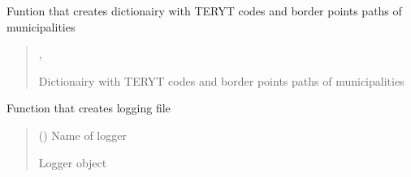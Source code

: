 \documentclass[letterpaper,10pt,english]{sphinxmanual}
\begin{document}

\begin{fulllineitems}
\label{\detokenize{pcm_utilities:pcm_utilities.create_geom_refs_dict}}
\pysigstartsignatures
{}
\pysigstopsignatures
\sphinxAtStartPar
Funtion that creates dictionairy with TERYT codes and border points paths of municipalities
\begin{quote}\begin{description}
\sphinxAtStartPar
\sphinxcode{\sphinxupquote{Dict}}{[}, \sphinxcode{\sphinxupquote{List}}{[}\sphinxcode{\sphinxupquote{Any}}{]}{]}

\sphinxAtStartPar
Dictionairy with TERYT codes and border points paths of municipalities

\end{description}\end{quote}

\end{fulllineitems}


\begin{fulllineitems}
\label{\detokenize{pcm_utilities:pcm_utilities.create_logger}}
\pysigstartsignatures
{}
\pysigstopsignatures
\sphinxAtStartPar
Function that creates logging file
\begin{quote}\begin{description}
\sphinxAtStartPar
{} () \textendash{} Name of logger

\sphinxAtStartPar
{}

\sphinxAtStartPar
Logger object

\end{description}\end{quote}

\end{fulllineitems}
\end{document}
